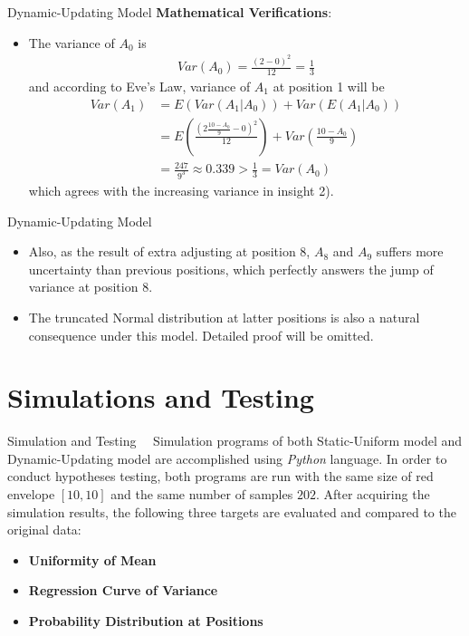 \documentclass[12pt]{beamer}
\renewcommand{\[}{\begin{equation*} \begin{aligned}} %
\renewcommand{\]}{\end{aligned} \end{equation*}}
\begin{document}
\begin{frame}{Dynamic-Updating Model}
	\textbf{Mathematical Verifications}:
	\begin{itemize}
		\item The variance of $A_0$ is
			\[
				Var(A_0) = \frac{(2-0)^2}{12} = \frac{1}{3}
			\]
			and according to Eve's Law, variance of $A_1$ at position 1 will be
			\[
				Var(A_1) &= E(Var(A_1|A_0)) + Var(E(A_1|A_0)) \\
					&= E(\frac{(2 \frac{10 - A_0}{9} - 0)^2}{12}) + Var(\frac{10 - A_0}{9}) \\
					&= \frac{247}{9^3} \approx 0.339 > \frac{1}{3} = Var(A_0)
			\]
			which agrees with the increasing variance in insight 2).
	\end{itemize}
\end{frame}

\begin{frame}{Dynamic-Updating Model}
	\begin{itemize}
		\item Also, as the result of extra adjusting at position 8, $A_8$ and $A_9$ suffers more uncertainty than previous positions, which perfectly answers the jump of variance at position 8.
		\item The truncated Normal distribution at latter positions is also a natural consequence under this model. Detailed proof will be omitted.
	\end{itemize}
\end{frame}

\section{Simulations and Testing}

\begin{frame}{Simulation and Testing}
	\ \ Simulation programs of both Static-Uniform model and Dynamic-Updating model are accomplished using \textit{Python} language. In order to conduct hypotheses testing, both programs are run with the same size of red envelope $[10, 10]$ and the same number of samples $202$. After acquiring the simulation results, the following three targets are evaluated and compared to the original data:
	\begin{itemize}
		\item \textbf{Uniformity of Mean}
		\item \textbf{Regression Curve of Variance}
		\item \textbf{Probability Distribution at Positions}
	\end{itemize}
\end{frame}
\end{document}
